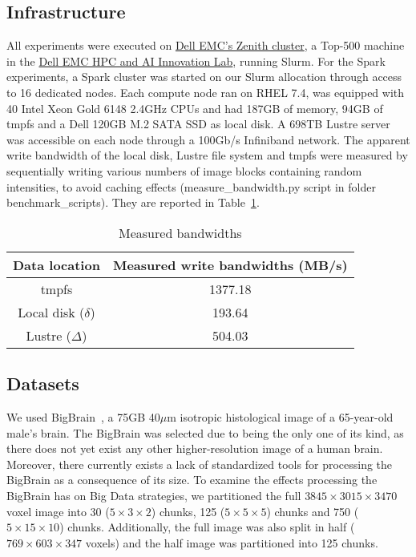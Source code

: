 \documentclass{IEEEtran}
\begin{document}

\subsection{Infrastructure} %

 All experiments were executed on 
 \href{https://www.dellemc.com/resources/en-us/asset/sales-documents/products/storage/h16221-hpc-lab-brochure.pdf}{Dell 
 EMC's Zenith cluster}, a Top-500 machine in the 
 \href{https://www.dellemc.com/en-us/solutions/high-performance-computing/HPC-AI-Innovation-Lab.htm}{Dell 
 EMC HPC and AI Innovation Lab}, running Slurm. For the Spark 
 experiments, a Spark cluster was started on our 
 Slurm allocation through access to 16 dedicated nodes. Each compute 
 node ran on RHEL 7.4, was 
 equipped with 40 Intel Xeon Gold 6148 2.4GHz CPUs and had
 187GB of memory, 94GB of tmpfs and a Dell 120GB M.2 SATA SSD as local disk. 
 A 698TB Lustre server was accessible on each node through a 100Gb/s 
 Infiniband network. The apparent write bandwidth of the local disk, 
 Lustre file system and tmpfs were measured by sequentially writing various numbers
 of image blocks containing random intensities, to avoid 
 caching effects (measure\_bandwidth.py script in folder 
 benchmark\_scripts). They are reported in Table~\ref{table:bdwdths}.

\begin{table}
\centering
\begin{tabular}{c|c}
\rowcolor{headcolor}
Data location & Measured write bandwidths (MB/s)\\
\hline
tmpfs                 & 1377.18 \\
Local disk ($\delta$) & 193.64  \\
Lustre   ($\Delta$)   & 504.03 \\
\end{tabular}
\caption{Measured bandwidths}
\label{table:bdwdths}
\end{table}

\subsection{Datasets} %

We used BigBrain~\cite{amunts2013bigbrain}, a 75GB 40$\mu$m isotropic 
histological image of a 65-year-old male's brain. The BigBrain was selected due 
to being the only one of its kind, as there does not yet exist any other
higher-resolution image of a human brain. Moreover, there currently exists a 
lack of standardized tools for processing the BigBrain as a consequence 
of its size. To examine the effects processing the BigBrain has on Big Data 
strategies, we partitioned the full $3845\times3015\times3470$ voxel image into 30 ($5\times3\times2$)
chunks, 125 ($5\times5\times5$) chunks and 750 ($5\times15\times10$) chunks. Additionally, the full 
image was also split in half ($769\times603\times347$ voxels) and the half image was 
partitioned into 125 chunks.
\end{document}
